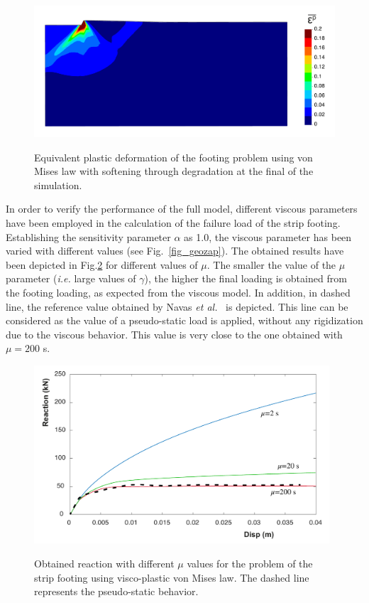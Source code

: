 \documentclass[applsci,journal,article,submit,moreauthors,pdftex]{Definitions/mdpi}
\begin{document}
\begin{figure}[!t]
\begin{center}
\includegraphics[width=12cm]{Figs/shear_band_foot.pdf}\\
\caption{Equivalent plastic deformation of the footing problem using von Mises law with softening through degradation at the final of the simulation.}
\label{fig_soft}
\end{center}
\end{figure}

In order to verify the performance of the full model, different viscous parameters have been employed in the calculation of the failure load of the strip footing. Establishing the sensitivity parameter $\alpha$ as 1.0, the viscous parameter has been varied with different values (see Fig.~\ref{fig_geozap}). The obtained results have been depicted in Fig.\ref{visco} for different values of $\mu$. The smaller the value of the $\mu$ parameter (\textit{i.e.} large values of $\gamma$), the higher the final loading is obtained from the footing loading, as expected from the viscous model. In addition, in dashed line, the reference value obtained by Navas \textit{et al.}~\cite{Navas2018} is depicted. This line can be considered as the value of a pseudo-static load is applied, without any rigidization due to the viscous behavior. This value is very close to the one obtained with $\mu=200$ s. 

\begin{figure}
\begin{center}
\includegraphics[width=11cm]{Figs/visco_d.pdf}\\
\caption{Obtained reaction with different $\mu$ values for the problem of the strip footing using visco-plastic von Mises law. The dashed line represents the pseudo-static behavior.}
\label{visco}
\end{center}
\end{figure}
\end{document}

